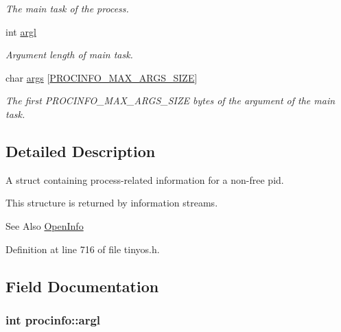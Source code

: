 \begin{DoxyCompactItemize}
\begin{DoxyCompactList}\small\item\em The main task of the process. \end{DoxyCompactList}\item 
int \hyperlink{structprocinfo_ac63081c5a10bc230c115eea36c5f22fd}{argl}
\begin{DoxyCompactList}\small\item\em Argument length of main task. \end{DoxyCompactList}\item 
char \hyperlink{structprocinfo_ac812ea3215fafc8ced9f91320b2d3959}{args} \mbox{[}\hyperlink{group__syscalls_ga657ad9e9d81dcca25fb225cf99051e0d}{P\-R\-O\-C\-I\-N\-F\-O\-\_\-\-M\-A\-X\-\_\-\-A\-R\-G\-S\-\_\-\-S\-I\-Z\-E}\mbox{]}
\begin{DoxyCompactList}\small\item\em The first {\ttfamily P\-R\-O\-C\-I\-N\-F\-O\-\_\-\-M\-A\-X\-\_\-\-A\-R\-G\-S\-\_\-\-S\-I\-Z\-E} bytes of the argument of the main task. \end{DoxyCompactList}\end{DoxyCompactItemize}


\subsection{Detailed Description}
A struct containing process-\/related information for a non-\/free pid. 

This structure is returned by information streams. \begin{DoxySeeAlso}{See Also}
\hyperlink{group__syscalls_gaf326b11574cdc84a9e21b9d860076821}{Open\-Info} 
\end{DoxySeeAlso}


Definition at line 716 of file tinyos.\-h.



\subsection{Field Documentation}
\hypertarget{structprocinfo_ac63081c5a10bc230c115eea36c5f22fd}{
\subsubsection[{argl}]{\setlength{\rightskip}{0pt plus 5cm}int procinfo\-::argl}}\label{structprocinfo_ac63081c5a10bc230c115eea36c5f22fd}


